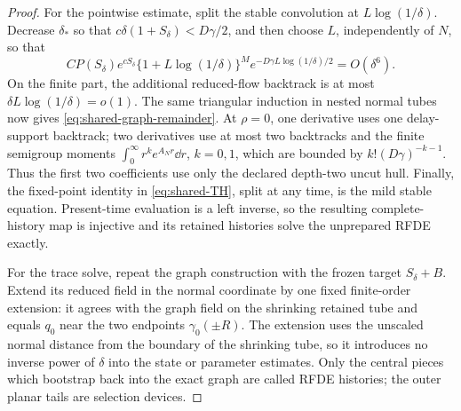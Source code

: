\begin{proof}
For the pointwise estimate, split the stable convolution at
\(L\log(1/\delta)\).  Decrease \(\delta_*\) so that
\(c\delta(1+S_\delta)<D\gamma/2\), and then choose \(L\), independently of
\(N\), so that
\begin{equation}
 CP(S_\delta)e^{cS_\delta}
 \{1+L\log(1/\delta)\}^M
 e^{-D\gamma L\log(1/\delta)/2}=O(\delta^6).          \label{eq:shared-convolution-tail}
\end{equation}
On the finite part, the additional reduced-flow backtrack is at most
\(\delta L\log(1/\delta)=o(1)\).  The same triangular induction in nested
normal tubes now gives \cref{eq:shared-graph-remainder}.  At
\(\rho=0\), one derivative uses one delay-support backtrack; two derivatives
use at most two backtracks and the finite semigroup moments
\(\int_0^\infty r^ke^{A_Nr}\dd r\), \(k=0,1\), which are bounded by
\(k!(D\gamma)^{-k-1}\).  Thus the first two coefficients use only the
declared depth-two uncut hull.  Finally,
the fixed-point identity in \cref{eq:shared-TH}, split at any time, is the
mild stable equation.  Present-time evaluation is a left inverse, so the
resulting complete-history map is injective and its retained histories solve
the unprepared RFDE exactly.

For the trace solve, repeat the graph construction with the frozen target
\(S_\delta+B\).  Extend its reduced field in the normal coordinate by one
fixed finite-order extension: it agrees with the graph field on the
shrinking retained tube and equals \(q_0\) near the two endpoints
\(\gamma_0(\pm R)\).  The extension uses the unscaled normal distance from
the boundary of the shrinking tube, so it introduces no inverse power of
\(\delta\) into the state or parameter estimates.  Only the central pieces
which bootstrap back into the exact graph are called RFDE histories; the
outer planar tails are selection devices.


\end{proof}
